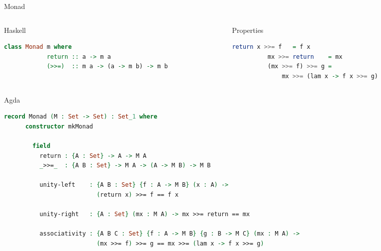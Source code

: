 \documentclass{beamer}
\begin{document}
\begin{frame}[fragile]{Monad}
  \begin{columns}[t]
    \begin{column}{.5\textwidth}
      \begin{block}{Haskell}
        \begin{lstlisting}[language=Haskell, mathescape]
          class Monad m where
            return :: a -> m a
            (>>=)  :: m a -> (a -> m b) -> m b
        \end{lstlisting}
      \end{block}
    \end{column}

    \begin{column}{.5\textwidth}
      \begin{block}{Properties}
        \begin{lstlisting}[language=Haskell, mathescape]
          return x >>= f   = f x
          mx >>= return    = mx
          (mx >>= f) >>= g =
              mx >>= (lam x -> f x >>= g)
        \end{lstlisting}
      \end{block}
    \end{column}
  \end{columns}

  \begin{block}{Agda}
    \begin{lstlisting}[language=Agda, mathescape]
      record Monad (M : Set -> Set) : Set_1 where
      constructor mkMonad

        field
          return : {A : Set} -> A -> M A
          _>>=_  : {A B : Set} -> M A -> (A -> M B) -> M B

          unity-left    : {A B : Set} {f : A -> M B} (x : A) ->
                          (return x) >>= f == f x

          unity-right   : {A : Set} (mx : M A) -> mx >>= return == mx

          associativity : {A B C : Set} {f : A -> M B} {g : B -> M C} (mx : M A) ->
                          (mx >>= f) >>= g == mx >>= (lam x -> f x >>= g)
    \end{lstlisting}
  \end{block}
\end{frame}
\end{document}
